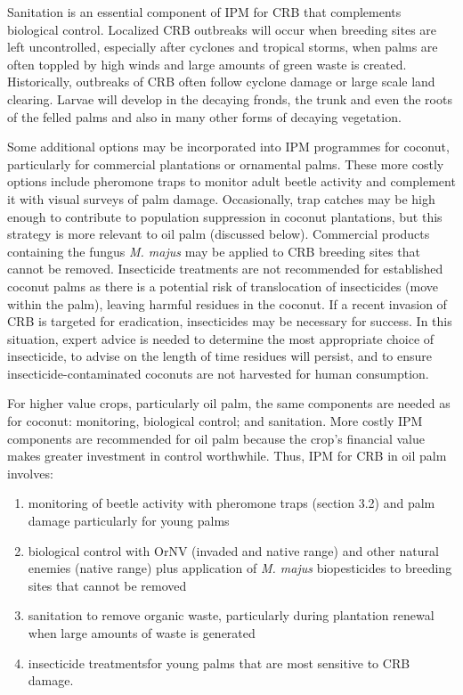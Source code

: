 \documentclass[twocolumn,letterpaper]{scrartcl}
\begin{document}
Sanitation  is  an  essential  component  of  IPM  for  CRB  that  complements biological control. Localized CRB outbreaks will occur when breeding sites are left uncontrolled, especially after cyclones and tropical storms, when palms are often toppled by high winds and large amounts of green waste is created. Historically, outbreaks of CRB often follow cyclone damage or large scale land clearing. Larvae will develop in the decaying fronds, the trunk and even the roots of the felled palms and also in many other forms of decaying vegetation. 

Some additional options may be incorporated into IPM programmes for coconut, particularly for commercial plantations or ornamental palms. These more costly options include pheromone traps to monitor adult beetle activity and complement it with visual surveys of palm damage. Occasionally, trap catches may be high enough to  contribute  to  population  suppression  in  coconut  plantations,  but  this  strategy  is  more relevant to oil palm (discussed below). Commercial products containing the fungus \textit{M. majus} may be applied to CRB breeding sites that cannot be removed. Insecticide treatments are not recommended for established coconut palms as there is a potential risk of translocation of insecticides (move within the palm), leaving harmful residues in the coconut. If a recent invasion of CRB is targeted for eradication, insecticides may  be  necessary  for  success.  In  this  situation,  expert  advice  is  needed  to  determine  the  most 
appropriate choice of insecticide, to advise on the length of time residues will persist, and to ensure insecticide-contaminated coconuts are not harvested for human consumption. 

For higher value crops, particularly oil palm, the same components are needed as for coconut: monitoring, biological control; and sanitation. More costly IPM components are recommended for oil palm because the crop’s financial value makes greater investment in control worthwhile. Thus, IPM for CRB in oil palm involves: 
\begin{enumerate}
\item monitoring of beetle activity with pheromone traps (section 3.2) and palm damage particularly for young palms
\item biological control with OrNV (invaded and native range) and other natural enemies (native range) plus application of \textit{M. majus} biopesticides to breeding sites 
that cannot be removed
\item sanitation to remove organic waste, particularly during plantation 
renewal when large amounts of waste is generated
\item insecticide treatmentsfor young palms that 
are most sensitive to CRB damage.
\end{enumerate} 
\end{document}
